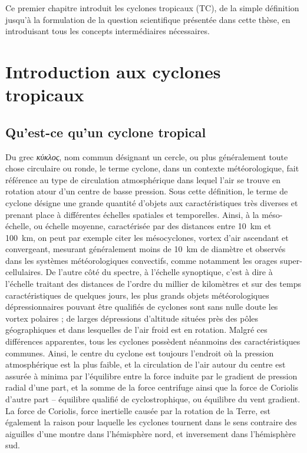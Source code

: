 \documentclass[../main.tex]{subfiles}
\begin{document}
\begin{itshape}
Ce premier chapitre introduit les cyclones tropicaux (TC), de la simple définition jusqu'à la formulation de la question scientifique présentée dans cette thèse, en introduisant tous les concepts intermédiaires nécessaires.
\end{itshape}

\minitoc
\section{Introduction aux cyclones tropicaux}

\subsection{Qu'est-ce qu'un cyclone tropical}\label{sec:quest_ce_qu_un_cyclone}

Du grec \textit{κύκλος}, nom commun désignant un cercle, ou plus généralement toute chose circulaire ou ronde, le terme cyclone, dans un contexte météorologique, fait référence au type de circulation atmosphérique dans lequel l'air se trouve en rotation atour d'un centre de basse pression. Sous cette définition, le terme de cyclone désigne une grande quantité d'objets aux caractéristiques très diverses et prenant place à différentes échelles spatiales et temporelles. Ainsi, à la
méso-échelle, ou échelle moyenne, caractérisée par des distances entre \SI{10}{\kilo\metre} et \SI{100}{\kilo\metre}, on peut par exemple citer les mésocyclones, vortex d'air ascendant et convergeant, mesurant généralement moins de \SI{10}{\kilo\metre} de diamètre et observés dans les systèmes météorologiques convectifs, comme notamment les orages super-cellulaires. De l'autre côté du spectre, à l'échelle synoptique, c'est à dire à l'échelle traitant des distances de l'ordre du millier de kilomètres et sur des
temps caractéristiques de quelques jours, les plus grands objets météorologiques dépressionnaires pouvant être qualifiés de cyclones sont sans
nulle doute les vortex polaires ; de larges dépressions d'altitude situées près des pôles géographiques et dans lesquelles de l'air froid est en rotation. Malgré ces différences apparentes, tous les cyclones possèdent néanmoins des caractéristiques communes. Ainsi, le centre du cyclone est toujours l'endroit où la pression atmosphérique est la plus faible, et la circulation de l'air autour du centre est assurée à minima par l'équilibre entre la force induite par le gradient de pression radial d'une part, et la somme
de la force centrifuge ainsi que la force de Coriolis d'autre part -- équilibre qualifié de cyclostrophique, ou équilibre du vent gradient. La force de Coriolis, force inertielle causée par la rotation de la Terre, est également la raison pour laquelle les cyclones tournent dans le sens contraire des aiguilles d'une montre dans l'hémisphère nord, et inversement dans l'hémisphère sud.
\end{document}
